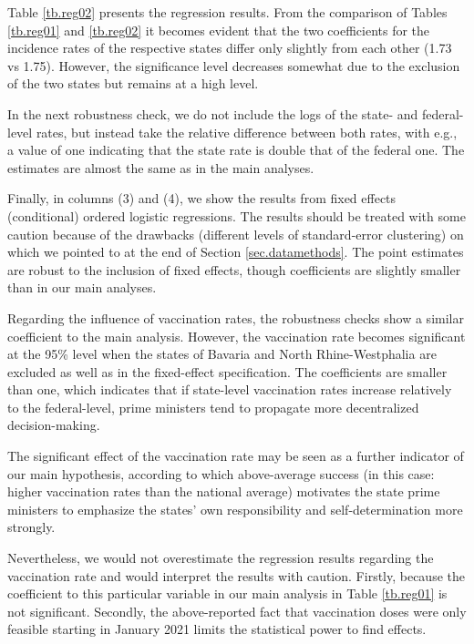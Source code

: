 \documentclass[12pt, abstracton]{scrartcl}
\begin{document}


Table \ref{tb.reg02} presents the regression results. From the comparison of Tables \ref{tb.reg01} and \ref{tb.reg02} it becomes evident that the two coefficients for the incidence rates of the respective states differ only slightly from each other (1.73 vs 1.75). However, the significance level decreases somewhat due to the exclusion of the two states but remains at a high level.

In the next robustness check, we do not include the logs of the state- and federal-level rates, but instead take the relative difference between both rates, with e.g., a value of one indicating that the state rate is double that of the federal one. The estimates are almost the same as in the main analyses.  %

Finally, in columns (3) and (4), we show the results from fixed effects (conditional) ordered logistic regressions. The results should be treated with some caution because of the drawbacks (different levels of standard-error clustering) on which we pointed to at the end of Section \ref{sec.datamethods}. The point estimates are robust to the inclusion of fixed effects, though coefficients are slightly smaller than in our main analyses.

Regarding the influence of vaccination rates, the robustness checks show a similar coefficient to the main analysis. However, the vaccination rate becomes significant at the 95\% level when the states of Bavaria and North Rhine-Westphalia are excluded as well as in the fixed-effect specification. The coefficients are smaller than one, which indicates that if state-level vaccination rates increase relatively to the federal-level, prime ministers tend to propagate more decentralized decision-making.

The significant effect of the vaccination rate may be seen as a further indicator of our main hypothesis, according to which above-average success (in this case: higher vaccination rates than the national average) motivates the state prime ministers to emphasize the states' own responsibility and self-determination more strongly. 	

Nevertheless, we would not overestimate the regression results regarding the vaccination rate and would interpret the results with caution. Firstly, because the coefficient to this particular variable in our main analysis in Table \ref{tb.reg01} is not significant. Secondly, the above-reported fact that vaccination doses were only feasible starting in January 2021 limits the statistical power to find effects.
\end{document}
